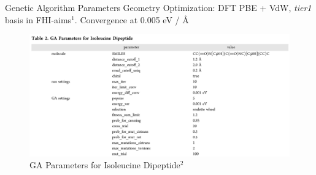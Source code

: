 \documentclass[10pt]{beamer}
\begin{document}
{%
\begin{frame}[fragile]{Genetic Algorithm Parameters}
	Geometry Optimization: DFT PBE + VdW, \emph{tier1} basis in FHI-aims$^1$.
	Convergence at 0.005 eV / \AA
	\begin{figure}
		\includegraphics[width=\linewidth, trim={0 0 0 1.2cm},clip]{images/Params.png}
		\caption*{GA Parameters for Isoleucine Dipeptide$^2$}
	\end{figure}
\end{frame}
}
\end{document}
